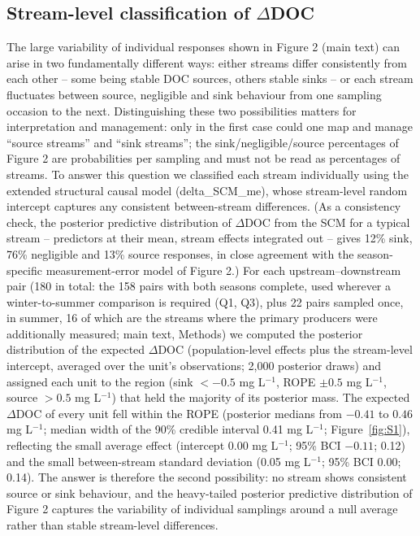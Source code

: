 \documentclass[11pt,a4paper]{article}
\begin{document}
\subsection{Stream-level classification of $\Delta$DOC}
The large variability of individual responses shown in Figure 2 (main text) can arise in two fundamentally different ways: either streams differ consistently from each other -- some being stable DOC sources, others stable sinks -- or each stream fluctuates between source, negligible and sink behaviour from one sampling occasion to the next. Distinguishing these two possibilities matters for interpretation and management: only in the first case could one map and manage ``source streams'' and ``sink streams''; the sink/negligible/source percentages of Figure 2 are probabilities per sampling and must not be read as percentages of streams. To answer this question we classified each stream individually using the extended structural causal model (delta\_SCM\_me), whose stream-level random intercept captures any consistent between-stream differences. (As a consistency check, the posterior predictive distribution of $\Delta$DOC from the SCM for a typical stream -- predictors at their mean, stream effects integrated out -- gives 12\% sink, 76\% negligible and 13\% source responses, in close agreement with the season-specific measurement-error model of Figure 2.) For each upstream--downstream pair (180 in total: the 158 pairs with both seasons complete, used wherever a winter-to-summer comparison is required (Q1, Q3), plus 22 pairs sampled once, in summer, 16 of which are the streams where the primary producers were additionally measured; main text, Methods) we computed the posterior distribution of the expected $\Delta$DOC (population-level effects plus the stream-level intercept, averaged over the unit's observations; 2,000 posterior draws) and assigned each unit to the region (sink $< -0.5$ mg L$^{-1}$, ROPE $\pm 0.5$ mg L$^{-1}$, source $> 0.5$ mg L$^{-1}$) that held the majority of its posterior mass. The expected $\Delta$DOC of every unit fell within the ROPE (posterior medians from $-0.41$ to $0.46$ mg L$^{-1}$; median width of the 90\% credible interval 0.41 mg L$^{-1}$; Figure~\ref{fig:S1}), reflecting the small average effect (intercept 0.00 mg L$^{-1}$; 95\% BCI $-0.11$; 0.12) and the small between-stream standard deviation (0.05 mg L$^{-1}$; 95\% BCI 0.00; 0.14). The answer is therefore the second possibility: no stream shows consistent source or sink behaviour, and the heavy-tailed posterior predictive distribution of Figure 2 captures the variability of individual samplings around a null average rather than stable stream-level differences.
\end{document}
